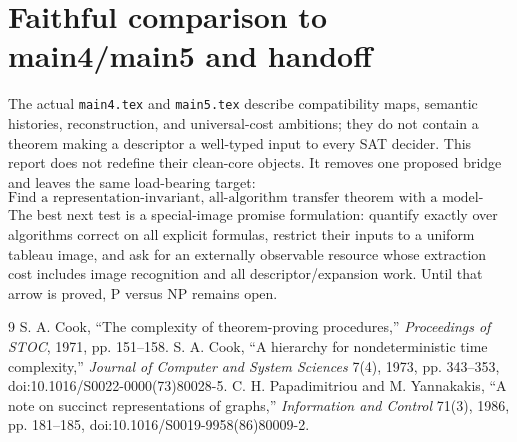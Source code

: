 \documentclass[11pt]{article}
\begin{document}
\section*{Faithful comparison to main4/main5 and handoff}
The actual \texttt{main4.tex} and \texttt{main5.tex} describe compatibility
maps, semantic histories, reconstruction, and universal-cost ambitions; they
do not contain a theorem making a descriptor a well-typed input to every SAT
decider.  This report does not redefine their clean-core objects.  It removes
one proposed bridge and leaves the same load-bearing target:
\[
\boxed{\text{Find a representation-invariant, all-algorithm transfer theorem
with a model-matched unconditional lower bound.}}
\]
The best next test is a special-image promise formulation: quantify exactly
over algorithms correct on all explicit formulas, restrict their inputs to a
uniform tableau image, and ask for an externally observable resource whose
extraction cost includes image recognition and all descriptor/expansion work.
Until that arrow is proved, P versus NP remains open.

\begin{thebibliography}{9}
S. A. Cook, ``The complexity of theorem-proving procedures,''
\emph{Proceedings of STOC}, 1971, pp. 151--158.
S. A. Cook, ``A hierarchy for nondeterministic time complexity,''
\emph{Journal of Computer and System Sciences} 7(4), 1973, pp. 343--353,
doi:10.1016/S0022-0000(73)80028-5.
C. H. Papadimitriou and M. Yannakakis, ``A note on succinct representations
of graphs,'' \emph{Information and Control} 71(3), 1986, pp. 181--185,
doi:10.1016/S0019-9958(86)80009-2.
\end{thebibliography}
\end{document}
